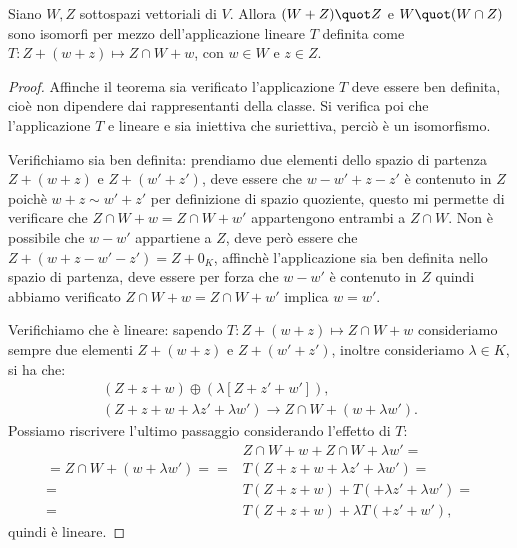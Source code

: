 \begin{teorema}
	Siano $W,Z$ sottospazi vettoriali di $V$.
	Allora $(W+Z)\quot Z$ e $W\quot(W\cap Z)$ sono isomorfi per mezzo dell'applicazione lineare $T$ definita come $T\colon Z+(  w +   z)\mapsto Z\cap W+  w$, con $  w\in W$ e $  z\in Z$.
\end{teorema}
\begin{proof}
	Affinche il teorema sia verificato l'applicazione $T$ deve essere ben definita, cioè non dipendere dai rappresentanti della classe.
	Si verifica poi che l'applicazione $T$ e lineare e sia iniettiva che suriettiva, perciò è un isomorfismo.

	Verifichiamo sia ben definita: prendiamo due elementi dello spazio di partenza $Z+(  w+  z)$ e $Z+(  w'+  z')$, deve essere che $  w-   w'+  z-  z'$ è contenuto in $Z$ poichè $  w+  z \sim   w'+  z'$ per definizione di spazio quoziente, questo mi permette di verificare che $Z\cap W+  w = Z\cap W+  w'$ appartengono entrambi a $Z\cap W$.
	Non è possibile che $  w-  w'$ appartiene a $Z$, deve però essere che $Z+(  w+  z-  w'-  z') = Z+0_K$, affinchè l'applicazione sia ben definita nello spazio di partenza, deve essere per forza che $  w-  w'$ è contenuto in $Z$ quindi abbiamo verificato  $Z\cap W+  w = Z\cap W+  w'$ implica $  w =   w'$.
	
	Verifichiamo che è lineare: sapendo $T\colon Z+(  w +   z)\mapsto Z\cap W+  w$ consideriamo sempre due elementi  $Z+(  w+  z)$ e $Z+(  w'+  z')$, inoltre consideriamo $\lambda\in K$, si ha che:
	\begin{gather*}
		(Z +   z +   w)\oplus(\lambda [Z +   z' +   w']),\\
		(Z +   z +   w + \lambda  z' + \lambda  w')\to  Z\cap W + (  w + \lambda  w').
	\end{gather*}
	Possiamo riscrivere l'ultimo passaggio considerando l'effetto di $T$: 
	\begin{equation*}
		\begin{aligned}
			&Z\cap W +   w + Z\cap W + \lambda  w' =\\ = Z\cap W + (  w + \lambda  w') =
			=&T(Z +   z +   w + \lambda  z' + \lambda  w' ) =\\
			=&T(Z +   z +   w) + T(+ \lambda  z' + \lambda  w') =\\
			=&T(Z +   z +   w) + \lambda T(+   z' +   w'),
		\end{aligned}
	\end{equation*}
	quindi è lineare.
	

\end{proof}
